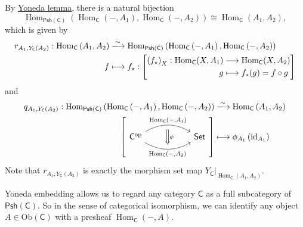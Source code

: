 \begin{prf}
    By \hyperref[th:yoneda_lemma]{Yoneda lemma}, there is a natural bijection
    \[
        \operatorname{Hom}_{\mathsf{Psh}(\mathsf{C})}\left(\operatorname{Hom}_{\mathsf{C}}\left(-,A_1\right), \operatorname{Hom}_{\mathsf{C}}\left(-,A_2\right)\right)\cong \operatorname{Hom}_{\mathsf{C}}\left(A_1,A_2\right),
    \]
    which is given by
    \begin{align*}
        r_{A_1,Y_{\mathsf{C}}(A_2)}:  \operatorname{Hom}_{\mathsf{C}}\left(A_1,A_2\right) &\xlongrightarrow{\sim}\operatorname{Hom}_{\mathsf{Psh}(\mathsf{C})}\left(\operatorname{Hom}_{\mathsf{C}}\left(-,A_1\right), \operatorname{Hom}_{\mathsf{C}}\left(-,A_2\right)\right) \\
         f & \longmapsto f_\star:\left[\begin{aligned}\left(f_\star\right)_X: \mathrm{Hom}_{\mathsf{C}}(X,A_1)&\longrightarrow \mathrm{Hom}_{\mathsf{C}}(X,A_2)\\
             g&\longmapsto f_*(g)=f\circ g\end{aligned}  \right]
    \end{align*}
    and
    \begin{align*}
        q_{A_1,Y_{\mathsf{C}}(A_2)}:\operatorname{Hom}_{\mathsf{Psh}(\mathsf{C})}\left(\operatorname{Hom}_{\mathsf{C}}\left(-,A_1\right), \operatorname{Hom}_{\mathsf{C}}\left(-,A_2\right)\right) & \xlongrightarrow{\sim}\operatorname{Hom}_{\mathsf{C}}\left(A_1,A_2\right) \\
        {  \left[ \begin{tikzcd}[ampersand replacement=\&]
            \mathsf{C}^{\mathrm{op}} \arrow[r, "\operatorname{Hom}_{\mathsf{C}}\left(-{,}A_1\right)"{name=A, above}, bend left] \arrow[r, "\operatorname{Hom}_{\mathsf{C}}\left(-{,}A_2\right)"'{name=B, below}, bend right] \&[+30pt] \mathsf{Set}
            \arrow[Rightarrow, shorten <=5.5pt, shorten >=5.5pt, from=A.south-|B, to=B, "\phi"]
        \end{tikzcd}\right] } & \longmapsto \phi_{A_1}\left(\operatorname{id}_{A_1}\right)
    \end{align*}
    Note that $r_{A_1,Y_{\mathsf{C}}(A_2)}$ is exactly the morphism set map $\left.Y_{\mathsf{C}}\right|_{\operatorname{Hom}_{\mathsf{C}}\left(A_1,A_2\right)}$.
\end{prf}

Yoneda embedding allows us to regard any category $\mathsf{C}$ as a full subcategory of $\mathsf{Psh}(\mathsf{C})$. So in the sense of categorical isomorphism, we can identify any object $A\in \mathrm{Ob}(\mathsf{C})$ with a presheaf $\operatorname{Hom}_{\mathsf{C}}(-, A)$. 

